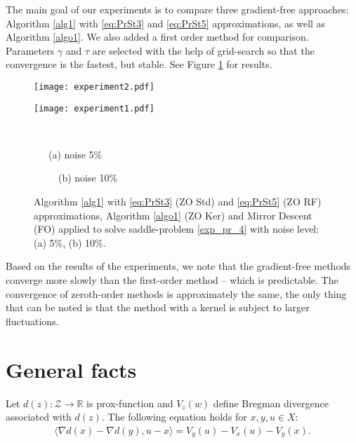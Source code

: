 \documentclass[runningheads]{llncs}
\begin{document}
The main goal of our experiments is to compare three gradient-free approaches: Algorithm \ref{alg1} with \eqref{eq:PrSt3} and \eqref{eq:PrSt5} approximations, as well as Algorithm \ref{algo1}. We also added a first order method for comparison. Parameters $\gamma$ and $\tau$ are selected with the help of grid-search so that the convergence is the fastest, but stable. 
See Figure \ref{fig:1} for results.
\begin{figure}[h!]
\centering
\begin{minipage}{0.48\textwidth}
\texttt{[image: experiment2.pdf]}
\end{minipage}%
\begin{minipage}{0.48\textwidth}
\texttt{[image: experiment1.pdf]}
\end{minipage}%
\\
\begin{minipage}{0.5\textwidth}
\centering
~~~(a) noise 5\%
\end{minipage}%
\begin{minipage}{0.5\textwidth}
\centering
~~~~~(b) noise 10\%
\end{minipage}%
\caption{Algorithm \ref{alg1} with \eqref{eq:PrSt3} (ZO Std) and \eqref{eq:PrSt5} (ZO RF) approximations, Algorithm \ref{algo1} (ZO Ker) and Mirror Descent (FO) applied to solve saddle-problem \eqref{exp_pr_4} with noise level: (a) 5\%, (b) 10\%.}
\label{fig:1}
\end{figure}

Based on the results of the experiments, we note that the gradient-free methods converge more slowly than the first-order method -- which is predictable. The convergence of zeroth-order methods is approximately the same, the only thing that can be noted is that the method with a kernel is subject to larger fluctuations.





\appendix

\section{General facts}

\begin{lemma}
Let $d(z): \mathcal{Z} \to \mathbb{R}$ is prox-function and $V_z(w)$ define Bregman divergence  associated with $d(z)$.
The following equation holds for $x,y,u \in X$:
\begin{eqnarray}
\label{temp111}
\langle \nabla d(x) - \nabla d(y), u -x \rangle = V_y(u)-V_x(u)-V_y(x).
\end{eqnarray}
\end{lemma}
\end{document}

